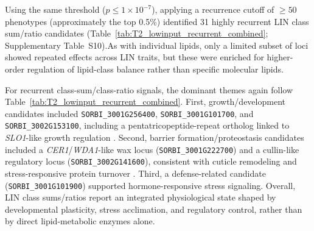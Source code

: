 \documentclass[9pt,twocolumn,twoside]{rilabRxiv}
\begin{document}
Using the same threshold (\(p \le 1\times10^{-7}\)), applying a recurrence cutoff of \(\geq 50\) phenotypes (approximately the top 0.5\%) identified 31 highly recurrent LIN class sum/ratio candidates (Table~\ref{tab:T2_lowinput_recurrent_combined}; Supplementary Table~S10).As with individual lipids, only a limited subset of loci showed repeated effects across LIN traits, but these were enriched for higher-order regulation of lipid-class balance rather than specific molecular lipids.

For recurrent class-sum/class-ratio signals, the dominant themes again follow Table~\ref{tab:T2_lowinput_recurrent_combined}. First, growth/development candidates included \texttt{SORBI\_3001G256400}, \texttt{SORBI\_3001G101700}, and \texttt{SORBI\_3002G153100}, including a pentatricopeptide-repeat ortholog linked to \textit{SLO1}-like growth regulation \citep{Sung2010}. Second, barrier formation/proteostasis candidates included a \textit{CER1}/\textit{WDA1}-like wax locus (\texttt{SORBI\_3001G222700}) and a cullin-like regulatory locus (\texttt{SORBI\_3002G141600}), consistent with cuticle remodeling and stress-responsive protein turnover \citep{Jung2006WDA1,WangXie2024Cullin}. Third, a defense-related candidate (\texttt{SORBI\_3001G101900}) supported hormone-responsive stress signaling. Overall, LIN class sums/ratios report an integrated physiological state shaped by developmental plasticity, stress acclimation, and regulatory control, rather than by direct lipid-metabolic enzymes alone.
\end{document}
